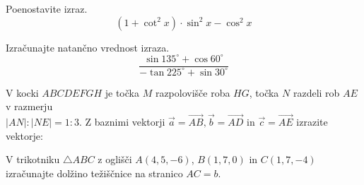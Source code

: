 \documentclass[addpoints]{exam}
\begin{document}
\begin{questions}


    \question[3]
    Poenostavite izraz. 
    $$ \left(1 + \cot^2x\right)\cdot\sin^2x-\cos^2x$$

    \begin{solution}[6.5cm]
       
    \end{solution}



    \question[4]
    Izračunajte natančno vrednost izraza. 
    $$ \dfrac{\sin{135^\circ} + \cos{60^\circ}}{-\tan{225^\circ}+\sin{30^\circ} }$$

    \begin{solution}[6cm]
       
    \end{solution}


\newpage

    \question
    V kocki $ABCDEFGH$ je točka $M$ razpolovišče roba $HG$, točka $N$ razdeli rob $AE$ v razmerju  \\
    $|AN|:|NE|=1:3$.
    Z baznimi vektorji $\overrightarrow{a}=\overrightarrow{AB}, \overrightarrow{b}=\overrightarrow{AD}$ in $\overrightarrow{c}=\overrightarrow{AE}$ izrazite vektorje: 

    \begin{solution}[5cm]

    \end{solution}

    

    

    \question[3]
    V trikotniku $\triangle ABC$ z oglišči $A(4,5,-6)$, $B(1,7,0)$ in $C(1,7,-4)$ izračunajte dolžino težiščnice na stranico $AC=b$.


\end{questions}
\end{document}

